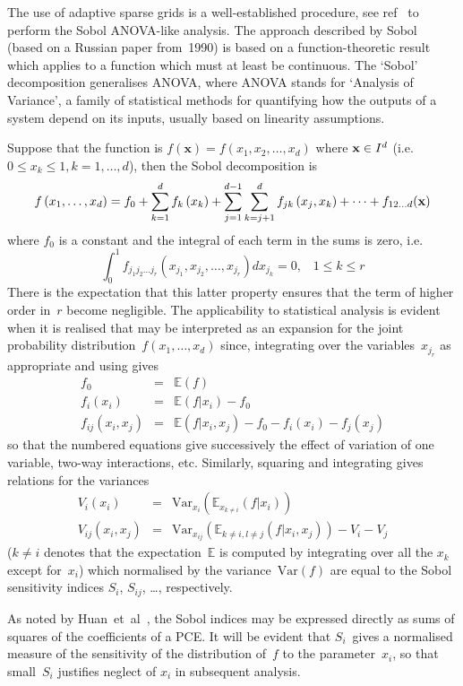 The use of adaptive sparse grids is a well-established procedure, see ref~\cite{He03Adap}
to perform the Sobol ANOVA-like analysis.
The approach described by Sobol~\cite{So01Glob} (based on a Russian paper from~1990)
is based on a function-theoretic result which applies
to a function which must at least be continuous.
The `Sobol' decomposition generalises ANOVA, where ANOVA stands for `Analysis
of Variance', a family of statistical methods for quantifying how the outputs
of a system depend on its inputs, usually based on linearity assumptions.

Suppose that the function is $f\left(\mathbf{x}\right)=f\left(x_1,x_2,\dots,x_d\right)$
where ${\bf x} \in I^d$ (i.e.\ $0 \leq x_k \leq 1, k=1, \dots, d$), then the Sobol decomposition is
\begin{equation}\label{eq:fexp}
f\left(x_1,\ldots,x_d\right)=f_0+\sum_{k=1}^d f_k\left(x_k\right)+\sum_{j=1}^{d-1}\sum_{k=j+1}^d f_{jk}\left(x_j,x_k\right)+ \cdots +f_{12 \dots d}({\bf x})
\end{equation}
where $f_0$ is a constant and the integral of each term in the sums is zero, i.e.
\begin{equation}\label{eq:fint}
\int_0^1 f_{j_1 j_2 \dots j_r}\left(x_{j_1},x_{j_2},\dots,x_{j_r}\right)dx_{j_k}=0, \;\;\; 1 \leq k \leq r
\end{equation}
There is the expectation that this latter property ensures that the
term of higher order in~$r$ become negligible. The applicability to statistical
analysis is evident when it is realised that   may be interpreted as an expansion for the joint
probability distribution~$f\left(x_1,\ldots,x_d\right)$
since, integrating over the variables~$x_{j_r}$ as appropriate and using  gives
\begin{eqnarray}\label{eq:effe}
f_0&=&\mathbb{E}(f) \nonumber \\
f_i(x_i)&=&\mathbb{E}(f|x_i)-f_0 \label{eq:effe1}\\
f_{ij}(x_i,x_j)&=&\mathbb{E}(f|x_i,x_j)-f_0-f_i(x_i)-f_j(x_j) \label{eq:effe2}
\end{eqnarray}
so that the numbered equations give successively the effect of variation of one variable,
two-way interactions, etc. Similarly, squaring  and integrating gives
relations for the variances
\begin{eqnarray}\label{eq:sens}
V_i(x_i)&=&\mathrm{Var}_{x_i}\left(\mathbb{E}_{x_{k\neq i}}(f|x_i)\right) \\
V_{ij}(x_i,x_j)&=&\mathrm{Var}_{x_{ij}}\left(\mathbb{E}_{k\neq i, l\neq j}(f|x_i,x_j)\right)-V_i-V_j  \label{eq:sens2}
\end{eqnarray}
($k\neq i$ denotes that the expectation~$\mathbb{E}$ is computed by integrating over all the $x_k$ except for~$x_i$)
which normalised by the variance~$\mathrm{Var}(f)$ are equal to the Sobol sensitivity indices
$S_i$, $S_{ij}$, \ldots, respectively.

As noted by Huan~et~al~\cite[\S\,3.2]{Hu18Glob}, the Sobol indices may be expressed directly as sums of
squares of the coefficients of a PCE. It will be evident that $S_i$~gives a normalised measure
of the sensitivity of the distribution of~$f$ to the parameter~$x_i$, so that small~$S_i$
justifies neglect of $x_i$ in subsequent analysis.
